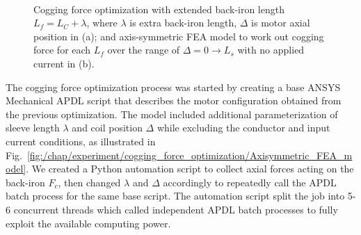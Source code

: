     \begin{figure}[h]
    \centering
    \\
    \caption{Cogging force optimization with extended back-iron length $L_f = L_C + \lambda$, where $\lambda$ is extra back-iron length, $\Delta$ is motor axial position in (a); and axis-symmetric \acs{FEA} model to work out cogging force for each $L_f$ over the range of $\Delta  = 0 \rightarrow L_s$ with no applied current in (b).}
    \end{figure}
    
    
    The cogging force optimization process was started by creating a base ANSYS Mechanical APDL script that describes the motor configuration obtained from the previous optimization. The model included additional parameterization of sleeve length $\lambda$ and coil position $\Delta$ while excluding the conductor and input current conditions, as illustrated in Fig.~\ref{fig:/chap/experiment/cogging_force_optimization/Axisymmetric_FEA_model}. We created a Python automation script to collect axial forces acting on the back-iron $F_c$, then changed $\lambda$ and $\Delta$ accordingly to repeatedly call the APDL batch process for the same base script. The automation script split the job into 5-6 concurrent threads which called independent APDL batch processes to fully exploit the available computing power.
    
